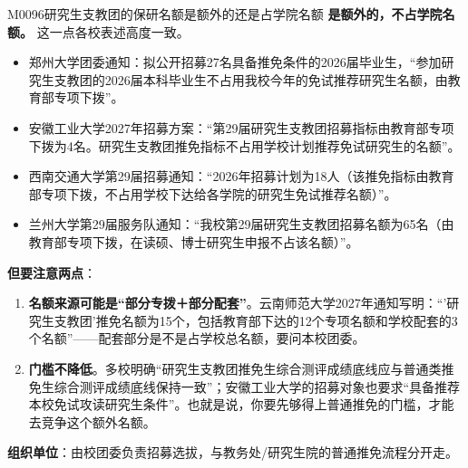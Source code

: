 \begin{qa}{M0096}{研究生支教团的保研名额是额外的还是占学院名额}
\textbf{是额外的，不占学院名额。} 这一点各校表述高度一致。

\begin{itemize}
  \item 郑州大学团委通知：拟公开招募27名具备推免条件的2026届毕业生，“参加研究生支教团的2026届本科毕业生不占用我校今年的免试推荐研究生名额，由教育部专项下拨”。
  \item 安徽工业大学2027年招募方案：“第29届研究生支教团招募指标由教育部专项下拨为4名。研究生支教团推免指标不占用学校计划推荐免试研究生的名额”。
  \item 西南交通大学第29届招募通知：“2026年招募计划为18人（该推免指标由教育部专项下拨，不占用学校下达给各学院的研究生免试推荐名额）”。
  \item 兰州大学第29届服务队通知：“我校第29届研究生支教团招募名额为65名（由教育部专项下拨，在读硕、博士研究生申报不占该名额）”。
\end{itemize}

\textbf{但要注意两点}：

\begin{enumerate}
  \item \textbf{名额来源可能是“部分专拨＋部分配套”}。云南师范大学2027年通知写明：“'研究生支教团'推免名额为15个，包括教育部下达的12个专项名额和学校配套的3个名额”——配套部分是不是占学校总名额，要问本校团委。
  \item \textbf{门槛不降低}。多校明确“研究生支教团推免生综合测评成绩底线应与普通类推免生综合测评成绩底线保持一致”；安徽工业大学的招募对象也要求“具备推荐本校免试攻读研究生条件”。也就是说，你要先够得上普通推免的门槛，才能去竞争这个额外名额。
\end{enumerate}

\textbf{组织单位}：由校团委负责招募选拔，与教务处/研究生院的普通推免流程分开走。
\end{qa}

